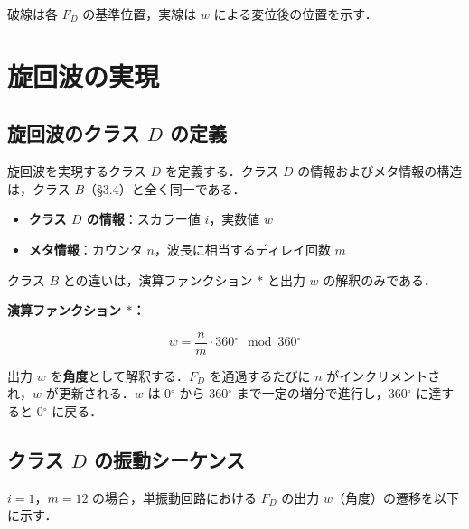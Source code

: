 \documentclass[12pt,a4paper]{ltjsarticle}
\begin{document}
破線は各 $F_D$ の基準位置，実線は $w$ による変位後の位置を示す．

\section{旋回波の実現}

\subsection{旋回波のクラス $D$ の定義}

旋回波を実現するクラス $D$ を定義する．クラス $D$ の情報およびメタ情報の構造は，クラス $B$（\S 3.4）と全く同一である．

\begin{itemize}
  \item \textbf{クラス $D$ の情報}：スカラー値 $i$，実数値 $w$
  \item \textbf{メタ情報}：カウンタ $n$，波長に相当するディレイ回数 $m$
\end{itemize}

クラス $B$ との違いは，演算ファンクション $*$ と出力 $w$ の解釈のみである．

\textbf{演算ファンクション $*$：}

\begin{equation}
w = \frac{n}{m} \cdot 360{}^\circ \mod 360{}^\circ
\end{equation}

出力 $w$ を\textbf{角度}として解釈する．$F_D$ を通過するたびに $n$ がインクリメントされ，$w$ が更新される．$w$ は $0{}^\circ$ から $360{}^\circ$ まで一定の増分で進行し，$360{}^\circ$ に達すると $0{}^\circ$ に戻る．

\subsection{クラス $D$ の振動シーケンス}

$i = 1$，$m = 12$ の場合，単振動回路における $F_D$ の出力 $w$（角度）の遷移を以下に示す．
\end{document}
